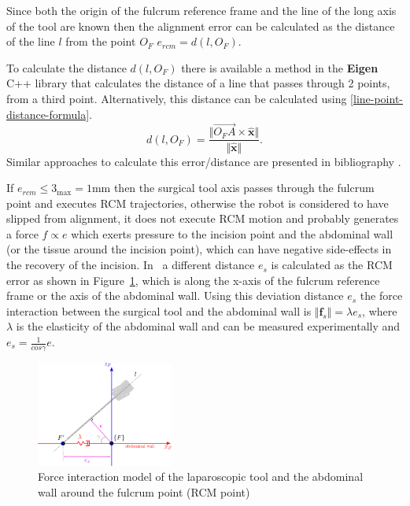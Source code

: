 Since both the origin of the fulcrum reference frame and the line of the long axis of the tool are known then the alignment error can be calculated as the distance of the line $l$ from the point $O_F$
$
e_{rcm} = d(l, O_F).
$

To calculate the distance $d(l, O_F)$ there is available a method in the \textbf{Eigen} C++ library that calculates the distance of a line that passes through 2 points, from a third point. Alternatively, this distance can be calculated using \ref{line-point-distance-formula}.
\begin{equation}
\label{line-point-distance-formula}
d(l, O_F) = \frac{\Vert \overrightarrow{O_FA} \times \mathbf{\hat{x}} \Vert}{\Vert \mathbf{\hat{x}} \Vert}.
\end{equation}
Similar approaches to calculate this error/distance are presented in bibliography \cite{Dong2016RobustTD,Bauzano2009ControlMF}.

If $e_{rcm} \leq 3_{\max} = 1$mm then the surgical tool axis passes through the fulcrum point and executes RCM trajectories, otherwise the robot is considered to have slipped from alignment, it does not execute RCM motion and probably generates a force $f \propto e$ which exerts pressure to the incision point and the abdominal wall (or the tissue around the incision point), which can have negative side-effects in the recovery of the incision. In~\cite{Bauzano2009ControlMF} a different distance $e_s$ is calculated as the RCM error as shown in Figure~\ref{rcm-force-interaction-model}, which is along the x-axis of the fulcrum reference frame or the axis of the abdominal wall. Using this deviation distance $e_s$ the force interaction between the surgical tool and the abdominal wall is $\Vert \mathbf{f}_s \Vert = λ e_s$, where $λ$ is the elasticity of the abdominal wall and can be measured experimentally and $e_s = \frac{1}{cosγ} e.$

\begin{center}
\begin{figure}[htbp]
\centering
\includegraphics[width=0.4\textwidth]{images/rcm-force-interaction-model.png}
\caption{Force interaction model of the laparoscopic tool and the abdominal wall around the fulcrum point (RCM point)}
\label{rcm-force-interaction-model}
\end{figure}
\end{center}

